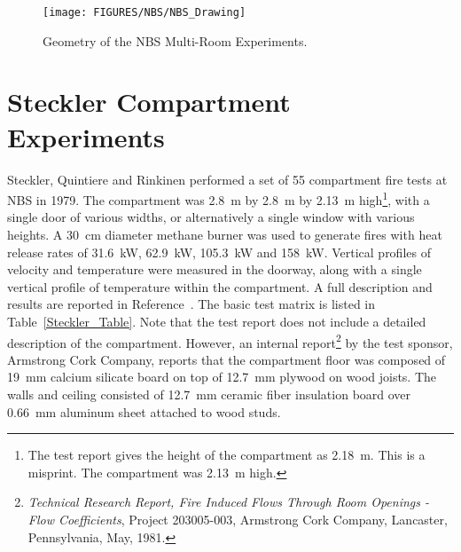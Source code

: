 \begin{sidewaysfigure}[p]
\begin{center}
\texttt{[image: FIGURES/NBS/NBS\_Drawing]}
\end{center}
\caption{Geometry of the NBS Multi-Room Experiments.}
\label{NBS_Drawing}
\end{sidewaysfigure}


\clearpage



\section{Steckler Compartment Experiments}

Steckler, Quintiere and Rinkinen performed a set of 55 compartment fire tests at NBS in 1979. The compartment was 2.8~m by 2.8~m by 2.13~m high\footnote{The test report
gives the height of the compartment as 2.18~m. This is a misprint. The compartment was 2.13~m high.}, with a single door of
various widths, or alternatively a single window with various heights. A 30~cm diameter methane burner was used to generate fires with heat release rates of
31.6~kW, 62.9~kW, 105.3~kW and 158~kW. Vertical profiles of velocity and temperature were measured in the doorway, along with a single vertical profile of temperature
within the compartment.
A full description and results are reported in Reference~\cite{Steckler:NBSIR_82-2520}. The basic test matrix is listed in Table~\ref{Steckler_Table}. Note that the
test report does not include a detailed description of the compartment. However, an internal report\footnote{ {\em Technical Research Report, Fire Induced Flows
Through Room Openings - Flow Coefficients}, Project 203005-003, Armstrong Cork Company, Lancaster, Pennsylvania, May, 1981.} by the test sponsor, Armstrong Cork Company,
reports that the compartment floor was composed of 19~mm calcium silicate board on top of 12.7~mm plywood on wood joists. The walls and ceiling consisted of
12.7~mm ceramic fiber insulation board over 0.66~mm aluminum sheet attached to wood studs.


